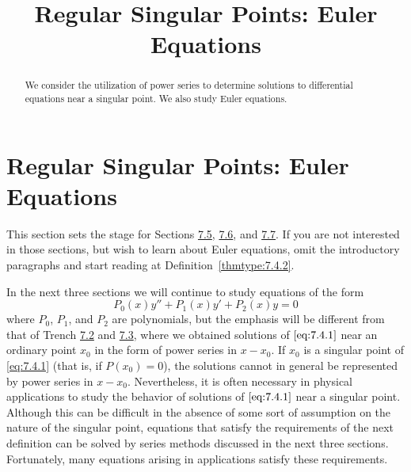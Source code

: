 \documentclass{ximera}
\title{Regular Singular Points:   Euler Equations}%
\begin{document}
\begin{abstract}
We consider the utilization of power series to determine solutions to differential equations near a singular point.  We also study Euler equations.
\end{abstract}

\maketitle

\section*{Regular Singular Points:   Euler Equations}

\begin{remark}This section sets the stage for Sections  \href{https://xerxes.ximera.org/differentialequations/main/frobeniusI/frobeniusI}{7.5},
\href{https://xerxes.ximera.org/differentialequations/main/frobeniusII/frobeniusII}{7.6},
and \href{https://xerxes.ximera.org/differentialequations/main/frobeniusIII/frobeniusIII}{7.7}. If you are not interested in those sections, but wish
to learn about Euler equations, omit the introductory paragraphs
and start reading at Definition~\ref{thmtype:7.4.2}.
\end{remark}

In the next three sections we will continue to study  equations of the form
\begin{equation}\label{eq:7.4.1}
P_0(x)y''+P_1(x)y'+P_2(x)y=0
\end{equation}
where $P_0$, $P_1$, and $P_2$ are polynomials, but the emphasis will
be different from that of Trench \href{https://ximera.osu.edu/ode/main/seriesSolNearOrdinaryPtI/seriesSolNearOrdinaryPtI}{7.2} and \href{https://ximera.osu.edu/ode/main/seriesSolNearOrdinaryPtII/seriesSolNearOrdinaryPtII}{7.3},
where we obtained solutions of $\eqref{eq:7.4.1}$ near an ordinary point $x_0$ in the
form of power series in $x-x_0$. If $x_0$ is a singular point of
\eqref{eq:7.4.1} (that is, if $P(x_0)=0$),  the solutions cannot in general be represented by power series in $x-x_0$. Nevertheless, it is
often necessary in physical applications to study the behavior of
solutions of $\eqref{eq:7.4.1}$ near a singular point. Although this can be difficult in the absence of some sort of assumption on the nature of
the singular point, equations that satisfy the requirements of the
next definition can be solved by series methods discussed in the
next three sections. Fortunately, many equations arising in applications satisfy these requirements.
\end{document}
